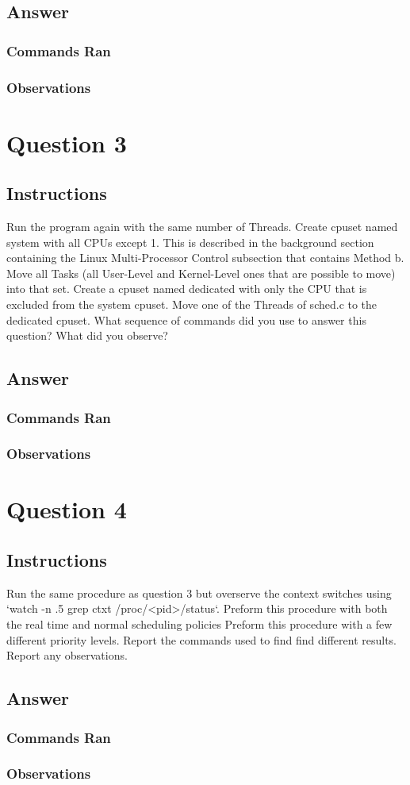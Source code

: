 \documentclass{assignment-x}
\begin{document}
\subsection{Answer}
\subsubsection{Commands Ran}
\subsubsection{Observations}

\section{Question 3}
\subsection{Instructions}
Run the program again with the same number of Threads. Create cpuset named system with all CPUs except 1. This is described in the background section containing the Linux Multi-Processor Control subsection that contains Method b. Move all Tasks (all User-Level and Kernel-Level ones that are possible to move) into that set. Create a cpuset named dedicated with only the CPU that is excluded from the system cpuset. Move one of the Threads of sched.c to the dedicated cpuset. What sequence of commands did you use to answer this question? What did you observe?
\subsection{Answer}
\subsubsection{Commands Ran}
\subsubsection{Observations}

\section{Question 4}
\subsection{Instructions}
Run the same procedure as question 3 but overserve the context switches using `watch -n .5 grep ctxt /proc/<pid>/status`. 
Preform this procedure with both the real time and normal scheduling policies
Preform this procedure with a few different priority levels.
Report the commands used to find find different results.
Report any observations.
\subsection{Answer}
\subsubsection{Commands Ran}
\subsubsection{Observations}
\end{document}
